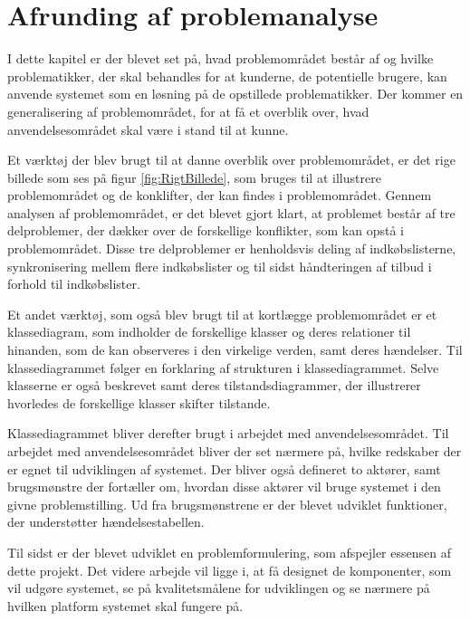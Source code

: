 \section{Afrunding af problemanalyse}
I dette kapitel er der blevet set på, hvad problemområdet består af og hvilke problematikker, der skal behandles for at kunderne, de potentielle brugere, kan anvende systemet som en løsning på de opstillede problematikker. Der kommer en generalisering af problemområdet, for at få et overblik over, hvad anvendelsesområdet skal være i stand til at kunne.

Et værktøj der blev brugt til at danne overblik over problemområdet, er det rige billede som ses på figur \ref{fig:RigtBillede}, som bruges til at illustrere problemområdet og de konklifter, der kan findes i problemområdet. Gennem analysen af problemområdet, er det blevet gjort klart, at problemet består af tre delproblemer, der dækker over de forskellige konflikter, som kan opstå i problemområdet. Disse tre delproblemer er henholdsvis deling af indkøbslisterne, synkronisering mellem flere indkøbslister og til sidst håndteringen af tilbud i forhold til indkøbslister.

Et andet værktøj, som også blev brugt til at kortlægge problemområdet er et klassediagram, som indholder de forskellige klasser og deres relationer til hinanden, som de kan observeres i den virkelige verden, samt deres hændelser. Til klassediagrammet følger en forklaring af strukturen i klassediagrammet. Selve klasserne er også beskrevet samt deres tilstandsdiagrammer, der illustrerer hvorledes de forskellige klasser skifter tilstande.

Klassediagrammet bliver derefter brugt i arbejdet med anvendelsesområdet. Til arbejdet med anvendelsesområdet bliver der set nærmere på, hvilke redskaber der er egnet til udviklingen af systemet. Der bliver også defineret to aktører, samt brugsmønstre der fortæller om, hvordan disse aktører vil bruge systemet i den givne problemstilling. Ud fra brugsmønstrene er der blevet udviklet funktioner, der understøtter hændelsestabellen.

Til sidst er der blevet udviklet en problemformulering, som afspejler essensen af dette projekt. Det videre arbejde vil ligge i, at få designet de komponenter, som vil udgøre systemet, se på kvalitetsmålene for udviklingen og se nærmere på hvilken platform systemet skal fungere på.